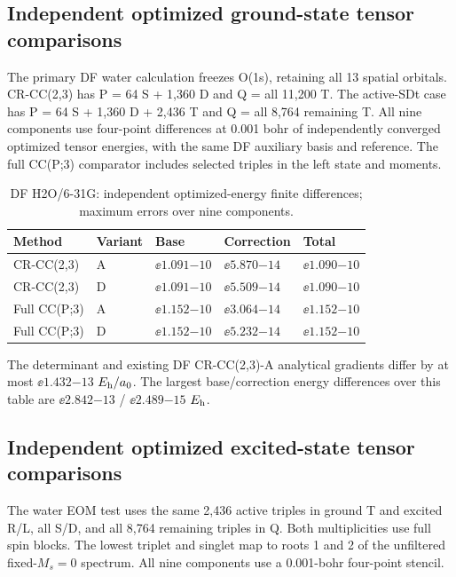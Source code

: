 \subsection{Independent optimized ground-state tensor comparisons}
The primary DF water calculation freezes O(1s), retaining all 13 spatial orbitals.
CR-CC(2,3) has P = 64 S + 1,360 D and Q = all 11,200 T. The active-SDt
case has P = 64 S + 1,360 D + 2,436 T and Q = all 8,764 remaining T.
All nine components use four-point differences at 0.001 bohr of independently
converged optimized tensor energies, with the same DF auxiliary basis and reference.
The full CC(P;3) comparator includes selected triples in the left state and moments.

\begin{table}[htbp]\centering\small
\begin{tabular}{lllll}
\toprule
Method & Variant & Base & Correction & Total\\
\midrule
CR-CC(2,3) & A & $\ee{1.091}{-10}$ & $\ee{5.870}{-14}$ & $\ee{1.090}{-10}$\\
CR-CC(2,3) & D & $\ee{1.091}{-10}$ & $\ee{5.509}{-14}$ & $\ee{1.090}{-10}$\\
Full CC(P;3) & A & $\ee{1.152}{-10}$ & $\ee{3.064}{-14}$ & $\ee{1.152}{-10}$\\
Full CC(P;3) & D & $\ee{1.152}{-10}$ & $\ee{5.232}{-14}$ & $\ee{1.152}{-10}$\\
\bottomrule
\end{tabular}
\caption{DF H2O/6-31G: independent optimized-energy finite differences; maximum errors over nine components.}\label{tab:groundnumerical}
\end{table}

The determinant and existing DF CR-CC(2,3)-A analytical gradients differ by at most $\ee{1.432}{-13}$ $E_{\mathrm h}/a_0$.
The largest base/correction energy differences over this table are $\ee{2.842}{-13}$ / $\ee{2.489}{-15}$ $E_{\mathrm h}$.

\subsection{Independent optimized excited-state tensor comparisons}
The water EOM test uses the same 2,436 active triples in ground T and excited R/L,
all S/D, and all 8,764 remaining triples in Q. Both multiplicities use full spin blocks.
The lowest triplet and singlet map to roots 1 and 2 of the unfiltered fixed-$M_s=0$
spectrum. All nine components use a 0.001-bohr four-point stencil.

